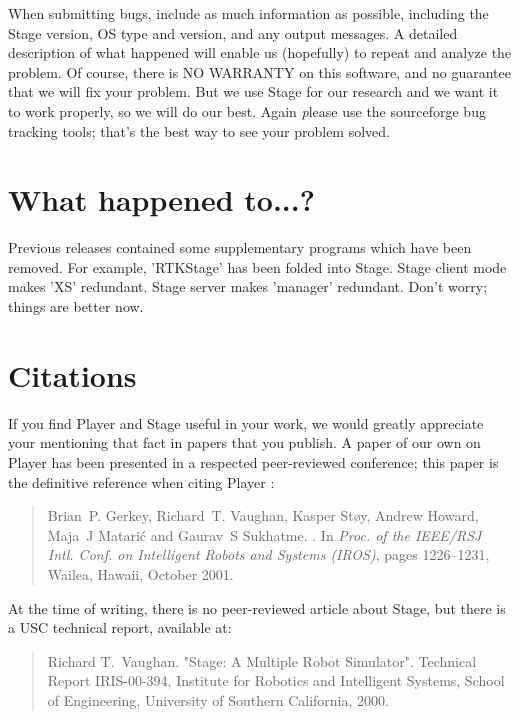 \documentclass[11pt,twoside]{report}
\begin{document}
    When submitting bugs, include as much information as possible,
    including the Stage version, OS type and version, and any output
    messages.  A detailed description of what happened will enable us
    (hopefully) to repeat and analyze the problem.  Of course, there
    is NO WARRANTY on this software, and no guarantee that we will fix
    your problem.  But we use Stage for our research and we want it to
    work properly, so we will do our best. Again {\emph please use the
    sourceforge bug tracking tools}; that's the best way to see your
    problem solved.

  \section{What happened to...?}
        
        Previous releases contained some supplementary programs which
        have been removed. For example, 'RTKStage' has been folded
        into Stage. Stage client mode makes 'XS' redundant. Stage
        server makes 'manager' redundant. Don't worry; things are
        better now.

\section{Citations}
If you find Player and Stage useful in your work, we would greatly
appreciate your mentioning that fact in papers that you publish.  A
paper of our own on Player has been presented in a respected
peer-reviewed conference; this paper is the definitive reference when
citing Player \cite{GerkeyVaughan01a}:
\begin{quote}
Brian~P. Gerkey, Richard~T. Vaughan, Kasper St\o{}y, Andrew Howard,
Maja~J Matari\'c and Gaurav~S Sukhatme.
.
\newblock In {\em Proc. of the IEEE/RSJ Intl. Conf. on Intelligent Robots and
  Systems (IROS)}, pages 1226--1231, Wailea, Hawaii, October 2001.
\end{quote}

At the time of writing, there is no peer-reviewed article about Stage,
but there is a USC technical report, available at:

\begin{quote}
Richard T.~Vaughan. "Stage: A Multiple Robot Simulator". Technical Report IRIS-00-394, Institute for Robotics and Intelligent Systems, School of Engineering, University of Southern California, 2000.
\end{quote}
\end{document}
